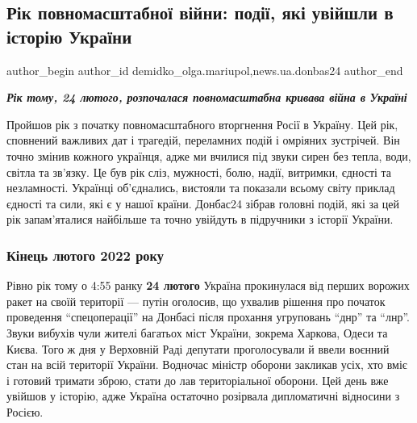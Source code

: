  
 
 
 
 
 
\subsection{Рік повномасштабної війни: події, які увійшли в історію України}
\label{sec:24_02_2023.stz.news.ua.donbas24.1.rik_vijny}
 
\ifcmt
 author_begin
   author_id demidko_olga.mariupol,news.ua.donbas24
 author_end
\fi

\begin{center}
  \em\bfseries\Large
Рік тому, 24 лютого, розпочалася повномасштабна кривава війна в Україні
\end{center}

Пройшов рік з початку повномасштабного вторгнення Росії в Україну. Цей рік,
сповнений важливих дат і трагедій, переламних подій і омріяних зустрічей. Він
точно змінив кожного українця, адже ми вчилися під звуки сирен без тепла, води,
світла та зв'язку. Це був рік сліз, мужності, болю, надії, витримки, єдності та
незламності. Українці об'єднались, вистояли та показали всьому світу приклад
єдності та сили, які є у нашої країни. Донбас24 зібрав головні подій, які за
цей рік запам'яталися найбільше та точно увійдуть в підручники з історії
України.


\subsubsection{Кінець лютого 2022 року}

Рівно рік тому о 4:55 ранку \textbf{24 лютого} Україна прокинулася від перших ворожих
ракет на своїй території — путін оголосив, що ухвалив рішення про початок
проведення \enquote{спецоперації} на Донбасі після прохання угруповань \enquote{днр} та \enquote{лнр}.
Звуки вибухів чули жителі багатьох міст України, зокрема Харкова, Одеси та
Києва. Того ж дня у Верховній Раді депутати проголосували й ввели воєнний стан
на всій території України. Водночас міністр оборони закликав усіх, хто вміє і
готовий тримати зброю, стати до лав територіальної оборони. Цей день вже
увійшов у історію, адже Україна остаточно розірвала дипломатичні відносини з
Росією.

